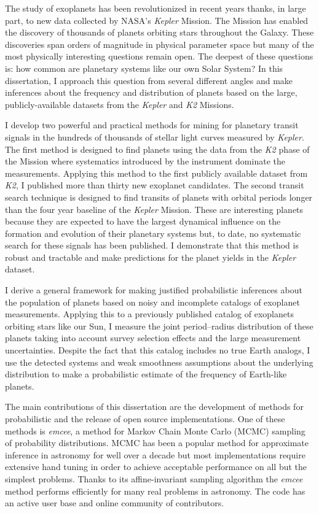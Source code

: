 The study of exoplanets has been revolutionized in recent years thanks, in
large part, to new data collected by NASA's \emph{Kepler} Mission.
The Mission has enabled the discovery of thousands of planets orbiting stars
throughout the Galaxy.
These discoveries span orders of magnitude in physical parameter space but
many of the most physically interesting questions remain open.
The deepest of these questions is: how common are planetary systems like our
own Solar System?
In this dissertation, I approach this question from several different angles
and make inferences about the frequency and distribution of planets based on
the large, publicly-available datasets from the \emph{Kepler} and \emph{K2}
Missions.

I develop two powerful and practical methods for mining for planetary transit
signals in the hundreds of thousands of stellar light curves measured by
\emph{Kepler}.
The first method is designed to find planets using the data from the
\emph{K2} phase of the Mission where systematics introduced by the instrument
dominate the measurements.
Applying this method to the first publicly available dataset from \emph{K2}, I
published more than thirty new exoplanet candidates.
The second transit search technique is designed to find transits of planets
with orbital periods longer than the four year baseline of the \emph{Kepler}
Mission.
These are interesting planets because they are expected to have the largest
dynamical influence on the formation and evolution of their planetary systems
but, to date, no systematic search for these signals has been published.
I demonstrate that this method is robust and tractable and make predictions
for the planet yields in the \emph{Kepler} dataset.

I derive a general framework for making justified probabilistic inferences
about the population of planets based on noisy and incomplete catalogs of
exoplanet measurements.
Applying this to a previously published catalog of exoplanets orbiting stars
like our Sun, I measure the joint period--radius distribution of these
planets taking into account survey selection effects and the large
measurement uncertainties.
Despite the fact that this catalog includes no true Earth analogs, I use the
detected systems and weak smoothness assumptions about the underlying
distribution to make a probabilistic estimate of the frequency of Earth-like
planets.

The main contributions of this dissertation are the development of methods for
probabilistic and the release of open source implementations.
One of these methods is \emph{emcee}, a method for Markov Chain Monte Carlo
(MCMC) sampling of probability distributions.
MCMC has been a popular method for approximate inference in astronomy for well
over a decade but most implementations require extensive hand tuning in order
to achieve acceptable performance on all but the simplest problems.
Thanks to its affine-invariant sampling algorithm the \emph{emcee} method
performs efficiently for many real problems in astronomy.
The code has an active user base and online community of contributors.
